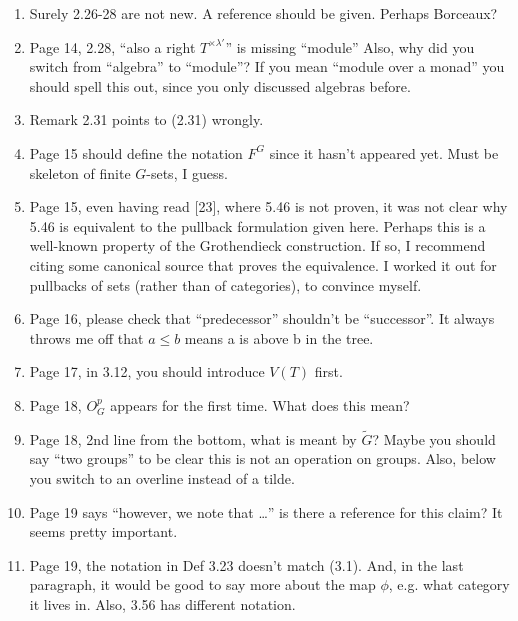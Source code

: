 \documentclass{article}
\begin{document}
\begin{enumerate}
\item
Surely 2.26-28 are not new. A reference should be given. Perhaps Borceaux?

\item
Page 14, 2.28, ``also a right $T^{\times \lambda'}$'' is missing ``module''
Also, why did you switch from ``algebra'' to ``module''? If you mean ``module over a monad'' you should spell this out, since you only discussed algebras before.

\item
Remark 2.31 points to (2.31) wrongly.



\item
Page 15 should define the notation $F^G$ since it hasn't appeared yet. Must be skeleton of finite $G$-sets, I guess.

\item
Page 15, even having read [23], where 5.46 is not proven, it was not clear why 5.46 is equivalent to the pullback formulation given here. Perhaps this is a well-known property of the Grothendieck construction. If so, I recommend citing some canonical source that proves the equivalence. I worked it out for pullbacks of sets (rather than of categories), to convince myself.

\item
Page 16, please check that ``predecessor'' shouldn't be ``successor''. It always throws me off that $a \leq b$ means a is above b in the tree.

\item
Page 17, in 3.12, you should introduce $V(T)$ first. 

\item
Page 18, $O_G^p$ appears for the first time. What does this mean?

\item
Page 18, 2nd line from the bottom, what is meant by $\tilde{G}$? Maybe you should say ``two groups'' to be clear this is not an operation on groups. Also, below you switch to an overline instead of a tilde.

\item
Page 19 says ``however, we note that \dots'' is there a reference for this claim? It seems pretty important.

\item
Page 19, the notation in Def 3.23 doesn't match (3.1). And, in the last paragraph, it would be good to say more about the map $\phi$, e.g. what category it lives in.
Also, 3.56 has different notation.


\end{enumerate}
\end{document}
